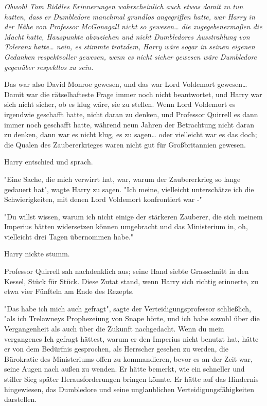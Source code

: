 {\emph{Obwohl Tom Riddles Erinnerungen wahrscheinlich auch etwas damit zu tun hatten, dass er Dumbledore manchmal grundlos angegriffen hatte, war Harry in der Nähe von Professor McGonagall nicht so gewesen… die zugegebenermaßen die Macht hatte, Hauspunkte abzuziehen und nicht Dumbledores Ausstrahlung von Toleranz hatte… nein, es stimmte trotzdem, Harry wäre sogar in seinen eigenen Gedanken respektvoller gewesen, wenn es nicht sicher gewesen wäre Dumbledore gegenüber respektlos zu sein.}

Das war also David Monroe gewesen, und das war Lord Voldemort gewesen… Damit war die rätselhafteste Frage immer noch nicht beantwortet, und Harry war sich nicht sicher, ob es klug wäre, sie zu stellen. Wenn Lord Voldemort es irgendwie geschafft hatte, nicht daran zu denken, und Professor Quirrell es dann immer noch geschafft hatte, während neun Jahren der Betrachtung nicht daran zu denken, dann war es nicht klug, es zu sagen… oder vielleicht war es das doch; die Qualen des Zaubererkrieges waren nicht gut für Großbritannien gewesen.

Harry entschied und sprach.

"Eine Sache, die mich verwirrt hat, war, warum der Zaubererkrieg so lange gedauert hat", wagte Harry zu sagen. "Ich meine, vielleicht unterschätze ich die Schwierigkeiten, mit denen Lord Voldemort konfrontiert war -"

"Du willst wissen, warum ich nicht einige der stärkeren Zauberer, die sich meinem Imperius hätten widersetzen können umgebracht und das Ministerium in, oh, vielleicht drei Tagen übernommen habe."

Harry nickte stumm.

Professor Quirrell sah nachdenklich aus; seine Hand siebte Grasschnitt in den Kessel, Stück für Stück. Diese Zutat stand, wenn Harry sich richtig erinnerte, zu etwa vier Fünfteln am Ende des Rezepts.

"Das habe ich mich auch gefragt", sagte der Verteidigungsprofessor schließlich, "als ich Trelawneys Prophezeiung von Snape hörte, und ich habe sowohl über die Vergangenheit als auch über die Zukunft nachgedacht. Wenn du mein vergangenes Ich gefragt hättest, warum er den Imperius nicht benutzt hat, hätte er von dem Bedürfnis gesprochen, als Herrscher gesehen zu werden, die Bürokratie des Ministeriums offen zu kommandieren, bevor es an der Zeit war, seine Augen nach außen zu wenden. Er hätte bemerkt, wie ein schneller und stiller Sieg später Herausforderungen bringen könnte. Er hätte auf das Hindernis hingewiesen, das Dumbledore und seine unglaublichen Verteidigungsfähigkeiten darstellen.

}
